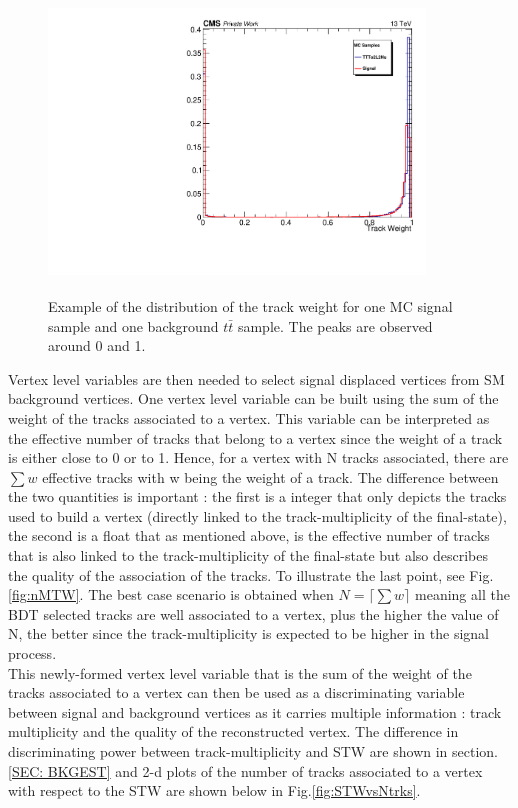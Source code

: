 \documentclass{cernatlasnote}
\begin{document}
\begin{figure}[ht]
\centering
\includegraphics[height=8cm, width=10cm, trim= 0cm 0cm 0cm 0cm,clip]{images/VTXEff/TrackWeightCompare.pdf}
\caption{\label{fig:ITW} Example of the distribution of the track weight for one MC signal sample and one background $t\bar{t}$ sample. The peaks are observed around 0 and 1.}
\end{figure} 

Vertex level variables are then needed to select signal displaced vertices from SM background vertices. One vertex level variable can be built using the sum of the weight of the tracks associated to a vertex. This variable can be interpreted as the effective number of tracks that belong to a vertex since the weight of a track is either close to 0 or to 1.
Hence, for a vertex with N tracks associated, there are $\sum w$ effective tracks with w being the weight of a track. The difference between the two quantities is important : the first is a integer that only depicts the tracks used to build a vertex (directly linked to the track-multiplicity of the final-state), the second is a float that as mentioned above, is the effective number of tracks  that is also linked to the track-multiplicity of the final-state but also describes the quality of the association of the tracks. To illustrate the last point, see Fig. \ref{fig:nMTW}. The best case scenario is obtained when $ N = \lceil \sum w \rceil$ meaning all the BDT selected tracks are well associated to a vertex, plus the higher the value of N, the better since the track-multiplicity is expected to be higher in the signal process.\\
This newly-formed vertex level variable that is the sum of the weight of the tracks associated to a vertex can then be used as a discriminating variable between signal and background vertices as it carries multiple information : track multiplicity and the quality of the reconstructed vertex. The difference in discriminating power between track-multiplicity and STW are shown in section.\ref{SEC: BKGEST} and 2-d plots of the number of tracks associated to a vertex with respect to the STW are shown below in Fig.\ref{fig:STWvsNtrks}. 
\end{document}
